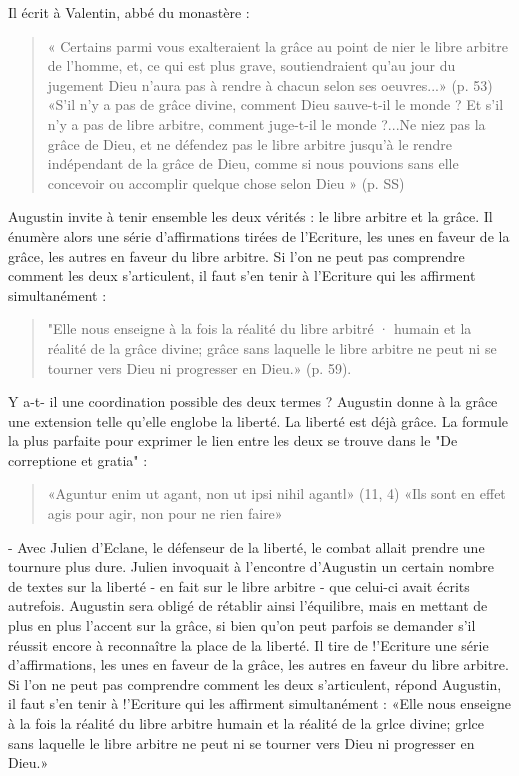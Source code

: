     Il écrit  à  Valentin, abbé du monastère :	
    \begin{quote}
        

 « Certains parmi vous exalteraient la grâce au point de nier le libre arbitre de
 l'homme, et, ce qui est plus grave, soutiendraient qu'au jour du jugement Dieu n'aura
 pas à rendre à chacun selon ses oeuvres...» (p. 53)	
«S'il n'y a pas de grâce divine, comment Dieu sauve-t-il le monde ? Et s'il n'y a	 pas de libre arbitre, comment juge-t-il le monde ?...Ne niez pas la grâce de Dieu, et
 ne défendez pas le libre arbitre jusqu'à le rendre indépendant de la grâce de Dieu,
comme	si nous pouvions sans elle concevoir	ou	accomplir quelque chose	selon	Dieu      » (p.  SS)
    \end{quote}
 
Augustin invite à tenir ensemble les deux vérités : le libre arbitre	et la grâce. Il énumère alors une série d'affirmations tirées de l'Ecriture, les unes en
faveur de la grâce, les autres en faveur du libre arbitre. Si l'on ne peut pas	comprendre comment les deux s'articulent, il faut s'en tenir à l'Ecriture qui les
affirment simultanément : 
\begin{quote}
    "Elle nous enseigne à la fois la réalité du libre arbitré · humain et la réalité de la grâce divine; grâce sans laquelle le libre arbitre ne peut ni se tourner vers Dieu ni progresser en Dieu.» (p. 59). 

\end{quote}

Y a-t- il une coordination possible des deux termes ? Augustin donne à la grâce une extension telle qu'elle englobe la liberté. La liberté est déjà grâce. La formule la plus parfaite pour exprimer le lien
entre les deux se trouve dans le "De correptione et gratia"  :	 
\begin{quote}
   «Aguntur  enim  ut	agant,  non  ut	ipsi nihil agantl» (11,  4)
«Ils sont en effet	agis pour agir, non pour ne rien faire» 
\end{quote}


-  Avec  Julien d'Eclane, le défenseur  de la liberté, le combat allait prendre une tournure plus dure. Julien invoquait à l'encontre d'Augustin un certain nombre de textes  sur la liberté - en fait sur le libre arbitre - que celui-ci avait écrits autrefois. Augustin sera obligé de rétablir ainsi l'équilibre, mais en mettant de plus en plus l'accent sur la grâce, si bien qu'on peut parfois se demander s'il réussit encore à reconnaître la place de la liberté. Il tire de !'Ecriture une série d'affirmations, les unes en faveur de la grâce, les autres en faveur du libre arbitre. Si l'on ne peut pas comprendre comment les deux s'articulent, répond Augustin, il faut s'en tenir à !'Ecriture qui les affirment simultanément : «Elle nous enseigne à la fois la réalité du libre arbitre humain et la réalité de la grlce divine; grlce sans laquelle le libre arbitre ne peut ni se tourner vers Dieu ni progresser en Dieu.»

